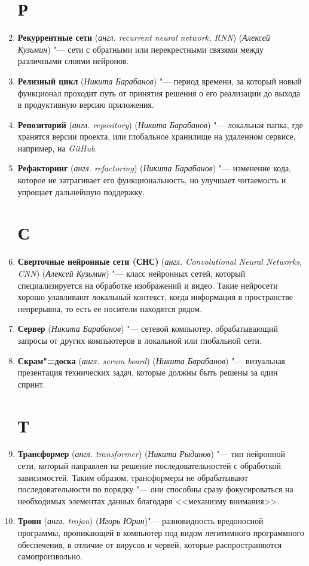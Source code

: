 \documentclass[14pt]{extarticle}
\begin{document}
\begin{enumerate}
    \section*{Р}
    \item \textbf{Рекуррентные сети} (\textit{англ. recurrent neural network, RNN}) (\textit{Алексей Кузьмин}) "--- сети с обратными или перекрестными связями между различными слоями нейронов.
    \item \textbf{Релизный цикл} (\textit{Никита Барабанов}) "--- период времени, за который новый функционал проходит путь от принятия решения о его реализации до выхода в продуктивную версию приложения.
    \item \textbf{Репозиторий} (\textit{англ. repository}) (\textit{Никита Барабанов}) "--- локальная папка, где хранятся версии проекта, или глобальное хранилище на удаленном сервисе, например, на \textit{GitHub}.
    \item \textbf{Рефакторинг} (\textit{англ. refactoring}) (\textit{Никита Барабанов}) "--- изменение кода, которое не затрагивает его функциональность, но улучшает читаемость и упрощает дальнейшую поддержку.
    \section*{С}
    \item \textbf{Сверточные нейронные сети (СНС)} (\textit{англ. Convolutional Neural Networks, CNN}) (\textit{Алексей Кузьмин}) "--- класс нейронных сетей, который специализируется на обработке изображений и видео. Такие нейросети хорошо улавливают локальный контекст, когда информация в пространстве непрерывна, то есть ее носители находятся рядом.
    \item \textbf{Сервер} (\textit{Никита Барабанов}) "--- сетевой компьютер, обрабатывающий запросы от других компьютеров в локальной или глобальной сети.
    \item \textbf{Скрам"=доска} (\textit{англ. scrum board}) (\textit{Никита Барабанов}) "--- визуальная презентация технических задач, которые должны быть решены за один спринт.
    \section*{Т}
    \item \textbf{Трансформер} (\textit{англ. transformer}) (\textit{Никита Рыданов}) "--- тип нейронной сети, который направлен на решение последовательностей с обработкой зависимостей. Таким образом, трансформеры не обрабатывают последовательности по порядку "--- они способны сразу фокусироваться на необходимых элементах данных благодаря <<механизму внимания>>.
    \item \textbf{Троян} (\textit{англ. trojan}) (\textit{Игорь Юрин})"--- разновидность вредоносной программы, проникающей в компьютер под видом легитимного программного обеспечения, в отличие от вирусов и червей,
    которые распространяются самопроизвольно.

\end{enumerate}
\end{document}
